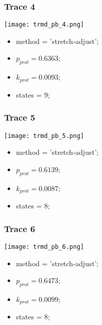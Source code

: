\subsubsection{Trace 4}
\begin{minipage}[c]{0.7\textwidth}
	\texttt{[image: trmd\_pb\_4.png]}
\end{minipage}
\hfill
\begin{minipage}[c]{0.45\textwidth}
	\begin{itemize}
		\item method = 'stretch-adjust';
		\item $p_{prot}=0.6363$;
		\item $k_{prot}=0.0093$;
		\item states = 9;
	\end{itemize}
\end{minipage}

\subsubsection{Trace 5}
\begin{minipage}[c]{0.7\textwidth}
	\texttt{[image: trmd\_pb\_5.png]}
\end{minipage}
\hfill
\begin{minipage}[c]{0.45\textwidth}
	\begin{itemize}
		\item method = 'stretch-adjust';
		\item $p_{prot}=0.6139$;
		\item $k_{prot}=0.0087$;
		\item states = 8;
	\end{itemize}
\end{minipage}

\subsubsection{Trace 6}
\begin{minipage}[c]{0.7\textwidth}
	\texttt{[image: trmd\_pb\_6.png]}
\end{minipage}
\hfill
\begin{minipage}[c]{0.45\textwidth}
	\begin{itemize}
		\item method = 'stretch-adjust';
		\item $p_{prot}=0.6473$;
		\item $k_{prot}=0.0099$;
		\item states = 8;
	\end{itemize}
\end{minipage}

